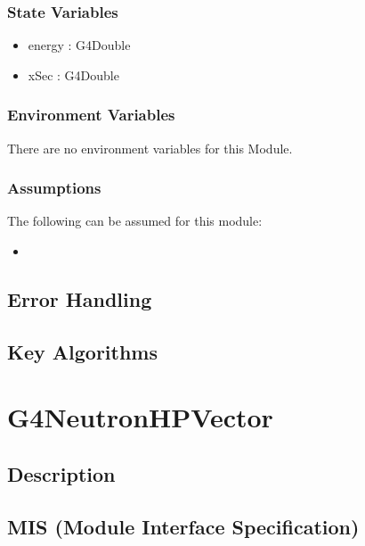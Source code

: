 \documentclass[12pt]{article}
\begin{document}
\subsubsection{State Variables}%
\begin{itemize}
\item energy : G4Double
\item xSec : G4Double
\end{itemize}

\subsubsection{Environment Variables}%
There are no environment variables for this Module.

\subsubsection{Assumptions}%
The following can be assumed for this module:
\begin{itemize}
\item
\end{itemize}

\subsection{Error Handling}

\subsection{Key Algorithms}


\section{G4NeutronHPVector}

\subsection{Description}

\subsection{MIS (Module Interface Specification)}
\end{document}
